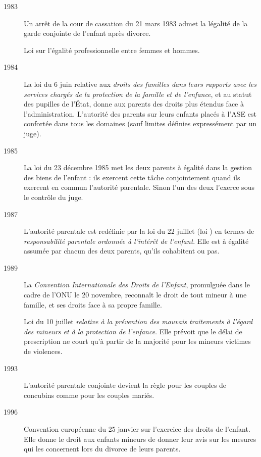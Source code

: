 \begin{description}
\item[1983] Un arrêt de la cour de cassation du 21 mars 1983 admet la légalité de la garde conjointe de l'enfant après divorce.

Loi sur l'égalité professionnelle entre femmes et hommes.

\item[1984] La loi du 6 juin relative aux \emph{droits des familles dans leurs rapports avec les services chargés de la protection de la famille et de l'enfance}, et au statut des pupilles de l'État, donne aux parents des droits plus étendus face à l'administration. L'autorité des parents sur leurs enfants placés à l'ASE est confortée dans tous les domaines (sauf limites définies expressément par un juge).

\item[1985] La loi du 23 décembre 1985 met les deux parents à égalité dans la gestion des biens de l'enfant : ils exercent cette tâche conjointement quand ils exercent en commun l'autorité parentale. Sinon l'un des deux l'exerce sous le contrôle du juge.

\item[1987] L'autorité parentale est redéfinie par la loi du 22 juillet (loi ) en termes de \emph{responsabilité parentale ordonnée à l'intérêt de l'enfant}. Elle est à égalité assumée par chacun des deux parents, qu'ils cohabitent ou pas.

\item[1989] La \emph{Convention Internationale des Droits de l'Enfant}, promulguée dans le cadre de l'ONU le 20 novembre, reconnaît le droit de tout mineur à une famille, et ses droits face à sa propre famille.

Loi du 10 juillet \emph{relative à la prévention des mauvais traitements à l'égard des mineurs et à la protection de l'enfance}. Elle prévoit que le délai de prescription ne court qu'à partir de la majorité pour les mineurs victimes de violences.

\item[1993] L'autorité parentale conjointe devient la règle pour les couples de concubins comme pour les couples mariés.

\item[1996] Convention européenne du 25 janvier sur l'exercice des droits de l'enfant. Elle donne le droit aux enfants mineurs de donner leur avis sur les mesures qui les concernent lors du divorce de leurs parents.


\end{description}
